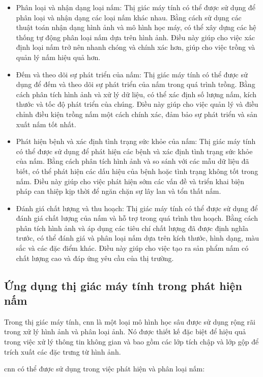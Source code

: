 \begin{itemize}
    \item Phân loại và nhận dạng loại nấm: Thị giác máy tính có thể được sử dụng để phân loại và nhận dạng các loại nấm khác nhau. Bằng cách sử dụng các thuật toán nhận dạng hình ảnh và mô hình học máy, có thể xây dựng các hệ thống tự động phân loại nấm dựa trên hình ảnh. Điều này giúp cho việc xác định loại nấm trở nên nhanh chóng và chính xác hơn, giúp cho việc trồng và quản lý nấm hiệu quả hơn.
    \item Đếm và theo dõi sự phát triển của nấm: Thị giác máy tính có thể được sử dụng để đếm và theo dõi sự phát triển của nấm trong quá trình trồng. Bằng cách phân tích hình ảnh và xử lý dữ liệu, có thể xác định số lượng nấm, kích thước và tốc độ phát triển của chúng. Điều này giúp cho việc quản lý và điều chỉnh điều kiện trồng nấm một cách chính xác, đảm bảo sự phát triển và sản xuất nấm tốt nhất.
    \item Phát hiện bệnh và xác định tình trạng sức khỏe của nấm: Thị giác máy tính có thể được sử dụng để phát hiện các bệnh và xác định tình trạng sức khỏe của nấm. Bằng cách phân tích hình ảnh và so sánh với các mẫu dữ liệu đã biết, có thể phát hiện các dấu hiệu của bệnh hoặc tình trạng không tốt trong nấm. Điều này giúp cho việc phát hiện sớm các vấn đề và triển khai biện pháp can thiệp kịp thời để ngăn chặn sự lây lan và tổn thất nấm.
    \item Đánh giá chất lượng và thu hoạch: Thị giác máy tính có thể được sử dụng để đánh giá chất lượng của nấm và hỗ trợ trong quá trình thu hoạch. Bằng cách phân tích hình ảnh và áp dụng các tiêu chí chất lượng đã được định nghĩa trước, có thể đánh giá và phân loại nấm dựa trên kích thước, hình dạng, màu sắc và các đặc điểm khác. Điều này giúp cho việc tạo ra sản phẩm nấm có chất lượng cao và đáp ứng yêu cầu của thị trường.
\end{itemize}


\subsection{Ứng dụng thị giác máy tính trong phát hiện nấm}

Trong thị giác máy tính, \acrfull{cnn} là một loại mô hình học sâu được sử dụng rộng rãi trong xử lý hình ảnh và phân loại ảnh. Nó được thiết kế đặc biệt để hiệu quả trong việc xử lý thông tin không gian và bao gồm các lớp tích chập và lớp gộp để trích xuất các đặc trưng từ hình ảnh.

\acrshort{cnn} có thể được sử dụng trong việc phát hiện và phân loại nấm:


